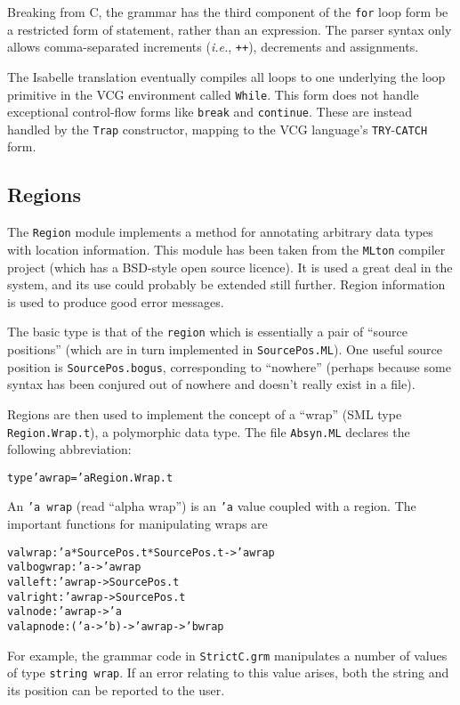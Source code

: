 \documentclass{article}
\newcommand{\MLsuffix}{.ML}
\newcommand{\srcfile}[1]{\texttt{#1}}
\newcommand{\MLfile}[1]{\srcfile{#1\MLsuffix}}
\newcommand{\ie}{\textit{i.e.}}
\begin{document}
Breaking from C, the grammar has the third component of the
\texttt{for} loop form be a restricted form of statement, rather than
an expression.  The parser syntax only allows comma-separated
increments (\ie, \texttt{++}), decrements and assignments.

The Isabelle translation eventually compiles all loops to one
underlying the loop primitive in the VCG environment called
\texttt{While}.  This form does not handle exceptional control-flow
forms like \texttt{break} and \texttt{continue}.  These are instead
handled by the \texttt{Trap} constructor, mapping to the VCG
language's \texttt{TRY}-\texttt{CATCH} form.


\subsection{Regions}
\label{sec:regions}

The \texttt{Region} module implements a method for annotating
arbitrary data types with location information.  This module has been
taken from the \texttt{MLton} compiler project (which has a BSD-style
open source licence).  It is used a great deal in the system, and its
use could probably be extended still further.  Region information is
used to produce good error messages.

The basic type is that of the \texttt{region} which is essentially a
pair of ``source positions'' (which are in turn implemented in
\MLfile{SourcePos}).  One useful source position is
\texttt{SourcePos.bogus}, corresponding to ``nowhere'' (perhaps
because some syntax has been conjured out of nowhere and doesn't
really exist in a file).

Regions are then used to implement the concept of a ``wrap'' (SML type
\texttt{Region.Wrap.t}), a polymorphic data type.  The file
\MLfile{Absyn} declares the following abbreviation:
\begin{alltt}
   type 'a wrap = 'a Region.Wrap.t
\end{alltt}
An \texttt{'a~wrap} (read ``alpha wrap'') is an \texttt{'a} value
coupled with a region.  The important functions for manipulating wraps
are
\begin{alltt}
   val wrap    : 'a * SourcePos.t * SourcePos.t -> 'a wrap
   val bogwrap : 'a -> 'a wrap
   val left    : 'a wrap -> SourcePos.t
   val right   : 'a wrap -> SourcePos.t
   val node    : 'a wrap -> 'a
   val apnode  : ('a -> 'b) -> 'a wrap -> 'b wrap
\end{alltt}
For example, the grammar code in \srcfile{StrictC.grm} manipulates a number
of values of type \texttt{string~wrap}.  If an error relating to this
value arises, both the string and its position can be reported to the
user.
\end{document}
